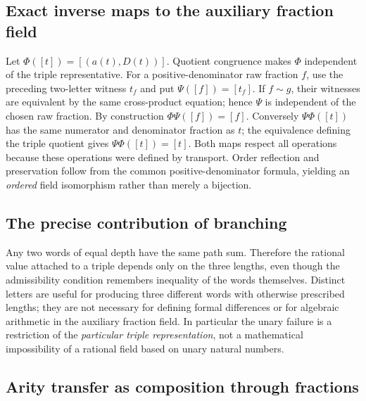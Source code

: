 \subsection{Exact inverse maps to the auxiliary fraction field}\label{supp:6-6}
\par{}\par\smallskip

Let $\Phi([t])=[(a(t),D(t))]$. Quotient congruence makes $\Phi$ independent of the triple representative. For a positive-denominator raw fraction $f$, use the preceding two-letter witness $t_f$ and put $\Psi([f])=[t_f]$. If $f\sim g$, their witnesses are equivalent by the same cross-product equation; hence $\Psi$ is independent of the chosen raw fraction. By construction $\Phi\Psi([f])=[f]$. Conversely $\Psi\Phi([t])$ has the same numerator and denominator fraction as $t$; the equivalence defining the triple quotient gives $\Psi\Phi([t])=[t]$. Both maps respect all operations because these operations were defined by transport. Order reflection and preservation follow from the common positive-denominator formula, yielding an \emph{ordered} field isomorphism rather than merely a bijection.

\subsection{The precise contribution of branching}\label{supp:6-7}
\par{}\par\smallskip

Any two words of equal depth have the same path sum. Therefore the rational value attached to a triple depends only on the three lengths, even though the admissibility condition remembers inequality of the words themselves. Distinct letters are useful for producing three different words with otherwise prescribed lengths; they are not necessary for defining formal differences or for algebraic arithmetic in the auxiliary fraction field. In particular the unary failure is a restriction of the \emph{particular triple representation}, not a mathematical impossibility of a rational field based on unary natural numbers.

\subsection{Arity transfer as composition through fractions}\label{supp:7-1}
\par{}\par\smallskip

